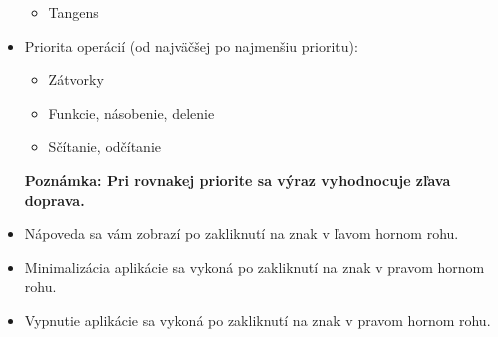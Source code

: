 \documentclass[11pt, a4paper]{article}
\begin{document}
\begin{itemize}
\begin{itemize}
            \item Tangens   
        \end{itemize}
        \item Priorita operácií (od najväčšej po najmenšiu prioritu):
        \begin{itemize}
            \item Zátvorky \fbox{\ $(\ \ )$\ } 
            \item Funkcie, násobenie, delenie
            \item Sčítanie, odčítanie
        \end{itemize}
        \textbf{Poznámka: Pri rovnakej priorite sa výraz vyhodnocuje zľava doprava.}
\item Nápoveda sa vám zobrazí po zakliknutí na znak \fbox{\ \textbf{[HELP]}\ } v ľavom hornom rohu.
        \item Minimalizácia aplikácie sa vykoná po zakliknutí na znak \fbox{\ \textbf{--}\ }  v pravom hornom rohu.
        \item Vypnutie aplikácie sa vykoná po zakliknutí na znak \fbox{\ \textbf{$\times$}\ }  v pravom hornom rohu.
    \end{itemize}
\end{document}
